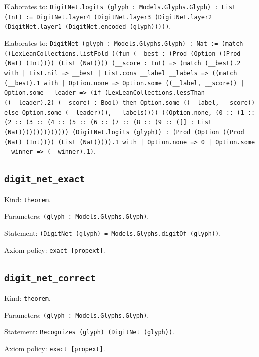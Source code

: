 \documentclass[11pt]{article}
\begin{document}
\noindent Elaborates to: \texttt{DigitNet.logits (glyph : Models.Glyphs.Glyph) : List (Int) := DigitNet.layer4 (DigitNet.layer3 (DigitNet.layer2 (DigitNet.layer1 (DigitNet.encoded (glyph)))))}.\par
\noindent Elaborates to: \texttt{DigitNet (glyph : Models.Glyphs.Glyph) : Nat := (match ((LexLeanCollections.listFold ((fun (\_\_best : (Prod (Option ((Prod (Nat) (Int)))) (List (Nat)))) (\_\_score : Int) => (match (\_\_best).2 with | List.nil => \_\_best | List.cons \_\_label \_\_labels => ((match (\_\_best).1 with | Option.none => Option.some ((\_\_label, \_\_score)) | Option.some \_\_leader => (if (LexLeanCollections.lessThan ((\_\_leader).2) (\_\_score) : Bool) then Option.some ((\_\_label, \_\_score)) else Option.some (\_\_leader))), \_\_labels)))) ((Option.none, (0 :: (1 :: (2 :: (3 :: (4 :: (5 :: (6 :: (7 :: (8 :: (9 :: ([] : List (Nat)))))))))))))) (DigitNet.logits (glyph)) : (Prod (Option ((Prod (Nat) (Int)))) (List (Nat))))).1 with | Option.none => 0 | Option.some \_\_winner => (\_\_winner).1)}.\par
\subsection*{\texttt{digit\_net\_exact}}
\noindent Kind: \texttt{theorem}.\par
\noindent Parameters: \texttt{(glyph : Models.Glyphs.Glyph)}.\par
\noindent Statement: \texttt{(DigitNet (glyph) = Models.Glyphs.digitOf (glyph))}.\par
\noindent Axiom policy: \texttt{exact [propext]}.\par
\subsection*{\texttt{digit\_net\_correct}}
\noindent Kind: \texttt{theorem}.\par
\noindent Parameters: \texttt{(glyph : Models.Glyphs.Glyph)}.\par
\noindent Statement: \texttt{Recognizes (glyph) (DigitNet (glyph))}.\par
\noindent Axiom policy: \texttt{exact [propext]}.\par
\end{document}
